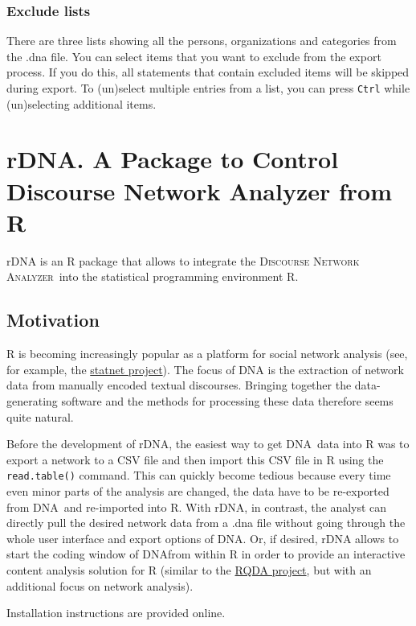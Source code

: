 \documentclass[12pt,a4paper]{scrreprt}
\newcommand{\dnalong}{\textsc{Discourse} \textsc{Network} \textsc{Analyzer}}
\newcommand{\dnashort}{\textsc{DNA}}
\newcommand{\code}[1]{\texttt{#1}}
\begin{document}
\subsection{Exclude lists}
There are three lists showing all the persons, organizations and categories from the .dna file. You can select items that you want to exclude from the export process. If you do this, all statements that contain excluded items will be skipped during export. To (un)select multiple entries from a list, you can press \code{Ctrl} while (un)selecting additional items.

\chapter{rDNA. A Package to Control Discourse Network Analyzer from R}
rDNA is an R package that allows to integrate the \dnalong\ into the statistical programming environment R.

\section{Motivation}
R is becoming increasingly popular as a platform for social network analysis (see, for example, the \href{http://www.statnetproject.org}{statnet project}). The focus of DNA is the extraction of network data from manually encoded textual discourses. Bringing together the data-generating software and the methods for processing these data therefore seems quite natural.

Before the development of rDNA, the easiest way to get \dnashort\ data into R was to export a network to a CSV file and then import this CSV file in R using the \code{read.table()} command. This can quickly become tedious because every time even minor parts of the analysis are changed, the data have to be re-exported from \dnashort\ and re-imported into R. With rDNA, in contrast, the analyst can directly pull the desired network data from a .dna file without going through the whole user interface and export options of \dnashort. Or, if desired, rDNA allows to start the coding window of \dnashort from within R in order to provide an interactive content analysis solution for R (similar to the \href{http://rqda.r-forge.r-project.org}{RQDA project}, but with an additional focus on network analysis).

Installation instructions are provided online.
\end{document}
